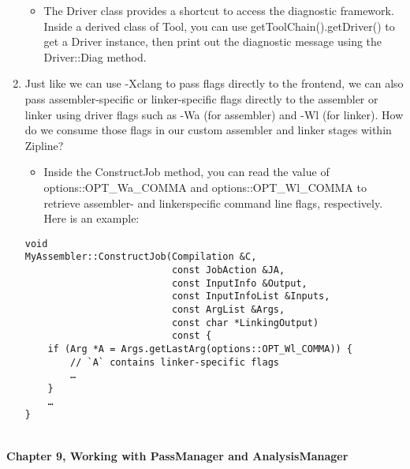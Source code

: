 \begin{enumerate}
\begin{itemize}
\item The Driver class provides a shortcut to access the diagnostic framework. Inside a derived class of Tool, you can use getToolChain().getDriver() to get a Driver instance, then print out the diagnostic message using the Driver::Diag method.
\end{itemize}

\item Just like we can use -Xclang to pass flags directly to the frontend, we can also pass assembler-specific or linker-specific flags directly to the assembler or linker using driver flags such as -Wa (for assembler) and -Wl (for linker). How do we consume those flags in our custom assembler and linker stages within Zipline?

\begin{itemize}
\item Inside the ConstructJob method, you can read the value of options::OPT\_Wa\_COMMA and options::OPT\_Wl\_COMMA to retrieve assembler- and linkerspecific command line flags, respectively. Here is an example:
\end{itemize}

\begin{lstlisting}[style=styleCXX]
void
MyAssembler::ConstructJob(Compilation &C,
						  const JobAction &JA,
						  const InputInfo &Output,
						  const InputInfoList &Inputs,
						  const ArgList &Args,
						  const char *LinkingOutput)
						  const {
	if (Arg *A = Args.getLastArg(options::OPT_Wl_COMMA)) {
		// `A` contains linker-specific flags
		…
	}
	…
}
\end{lstlisting}

\end{enumerate}


\hspace*{\fill} \\ %
\noindent
\textbf{Chapter 9, Working with PassManager and AnalysisManager}

